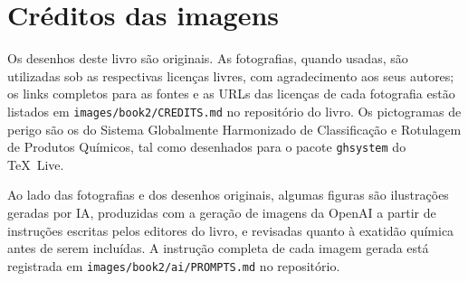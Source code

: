 \chapter*{Créditos das imagens}

Os desenhos deste livro são originais. As fotografias, quando usadas, são
utilizadas sob as respectivas licenças livres, com agradecimento aos seus
autores; os links completos para as fontes e as URLs das licenças de cada
fotografia estão listados em \texttt{images/book2/CREDITS.md} no
repositório do livro.
Os pictogramas de perigo são os do Sistema Globalmente Harmonizado de
Classificação e Rotulagem de Produtos Químicos, tal como desenhados para o
pacote \texttt{ghsystem} do \TeX\ Live.

\bigskip
Ao lado das fotografias e dos desenhos originais, algumas figuras são
ilustrações geradas por IA, produzidas com a geração de imagens da OpenAI a
partir de instruções escritas pelos editores do livro, e revisadas quanto à
exatidão química antes de serem incluídas. A instrução completa de cada
imagem gerada está registrada em \texttt{images/book2/ai/PROMPTS.md} no
repositório.

